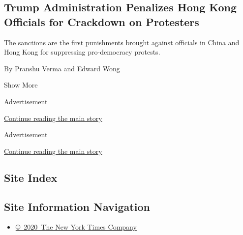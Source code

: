 \begin{enumerate}
  \hypertarget{trump-administration-penalizes-hong-kong-officials-for-crackdown-on-protesters}{%
  \subsection{Trump Administration Penalizes Hong Kong Officials for
  Crackdown on
  Protesters}\label{trump-administration-penalizes-hong-kong-officials-for-crackdown-on-protesters}}

  The sanctions are the first punishments brought against officials in
  China and Hong Kong for suppressing pro-democracy protests.

  By Pranshu Verma and Edward Wong
\end{enumerate}

Show More

Advertisement

\protect\hyperlink{after-mid4}{Continue reading the main story}

Advertisement

\protect\hyperlink{after-mktg}{Continue reading the main story}

\hypertarget{site-index}{%
\subsection{Site Index}\label{site-index}}

\hypertarget{site-information-navigation}{%
\subsection{Site Information
Navigation}\label{site-information-navigation}}

\begin{itemize}
\tightlist
\item
  \href{https://help.nytimes.com/hc/en-us/articles/115014792127-Copyright-notice}{©~2020~The
  New York Times Company}
\end{itemize}

